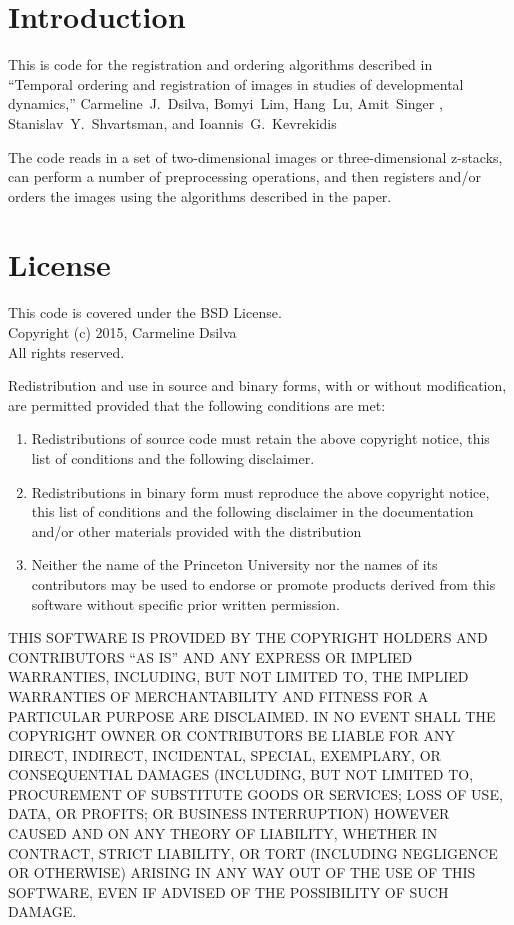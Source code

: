\documentclass[12pt]{article}
\begin{document}
\section{Introduction}

This is code for the registration and ordering algorithms described in \\
``Temporal ordering and registration of images in studies of developmental dynamics,'' Carmeline~J.~Dsilva, Bomyi~Lim, Hang~Lu, Amit~Singer , Stanislav~Y.~Shvartsman, and Ioannis~G.~Kevrekidis

The code reads in a set of two-dimensional images or three-dimensional z-stacks, can perform a number of preprocessing operations, and then registers and/or orders the images using the algorithms described in the paper. 

\section{License}

This code is covered under the BSD License.\\
Copyright (c) 2015, Carmeline Dsilva\\
All rights reserved.

Redistribution and use in source and binary forms, with or without
modification, are permitted provided that the following conditions are
met:

\begin{enumerate}

    \item Redistributions of source code must retain the above copyright
      notice, this list of conditions and the following disclaimer.
    \item Redistributions in binary form must reproduce the above copyright
      notice, this list of conditions and the following disclaimer in
      the documentation and/or other materials provided with the distribution
    \item Neither the name of the Princeton University nor the names
      of its contributors may be used to endorse or promote products derived
      from this software without specific prior written permission.
\end{enumerate}
THIS SOFTWARE IS PROVIDED BY THE COPYRIGHT HOLDERS AND CONTRIBUTORS ``AS IS''
AND ANY EXPRESS OR IMPLIED WARRANTIES, INCLUDING, BUT NOT LIMITED TO, THE
IMPLIED WARRANTIES OF MERCHANTABILITY AND FITNESS FOR A PARTICULAR PURPOSE
ARE DISCLAIMED. IN NO EVENT SHALL THE COPYRIGHT OWNER OR CONTRIBUTORS BE
LIABLE FOR ANY DIRECT, INDIRECT, INCIDENTAL, SPECIAL, EXEMPLARY, OR
CONSEQUENTIAL DAMAGES (INCLUDING, BUT NOT LIMITED TO, PROCUREMENT OF
SUBSTITUTE GOODS OR SERVICES; LOSS OF USE, DATA, OR PROFITS; OR BUSINESS
INTERRUPTION) HOWEVER CAUSED AND ON ANY THEORY OF LIABILITY, WHETHER IN
CONTRACT, STRICT LIABILITY, OR TORT (INCLUDING NEGLIGENCE OR OTHERWISE)
ARISING IN ANY WAY OUT OF THE USE OF THIS SOFTWARE, EVEN IF ADVISED OF THE
POSSIBILITY OF SUCH DAMAGE.
\end{document}
